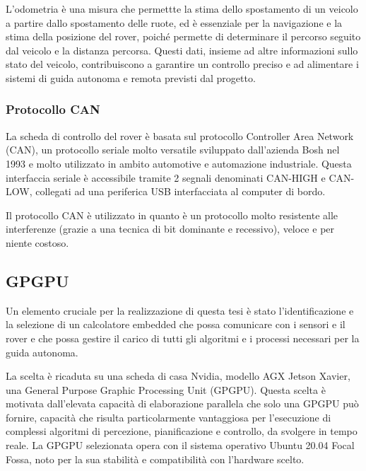 \noindent L'odometria è una misura che permettte la stima dello spostamento di un veicolo a partire dallo spostamento delle ruote, ed è essenziale per la navigazione e la stima della posizione del rover, poiché permette di determinare il percorso seguito dal veicolo e la distanza percorsa. Questi dati, insieme ad altre informazioni sullo stato del veicolo, contribuiscono a garantire un controllo preciso e ad alimentare i sistemi di guida autonoma e remota previsti dal progetto.

\subsubsection{Protocollo CAN}
La scheda di controllo del rover è basata sul protocollo Controller Area Network (CAN), un protocollo seriale molto versatile sviluppato dall'azienda Bosh nel 1993 e molto utilizzato in ambito automotive e automazione industriale. Questa interfaccia seriale è accessibile tramite 2 segnali denominati CAN-HIGH e CAN-LOW, collegati ad una periferica USB interfacciata al computer di bordo.

\noindent Il protocollo CAN è utilizzato in quanto è un protocollo molto resistente alle interferenze (grazie a una tecnica di bit dominante e recessivo), veloce e per niente costoso.  

\subsection{GPGPU}
Un elemento cruciale per la realizzazione di questa tesi è stato l'identificazione e la selezione di un calcolatore embedded che possa comunicare con i sensori e il rover e che possa gestire il carico di tutti gli algoritmi e i processi necessari per la guida autonoma.

\noindent La scelta è ricaduta su una scheda di casa Nvidia, modello AGX Jetson Xavier, una  General Purpose Graphic Processing Unit (GPGPU). Questa scelta è motivata dall'elevata capacità di elaborazione parallela che solo una GPGPU può fornire, capacità che risulta particolarmente vantaggiosa per l'esecuzione di complessi algoritmi di percezione, pianificazione e controllo, da svolgere in tempo reale. La GPGPU selezionata opera con il sistema operativo Ubuntu 20.04 Focal Fossa, noto per la sua stabilità e compatibilità con l'hardware scelto.

